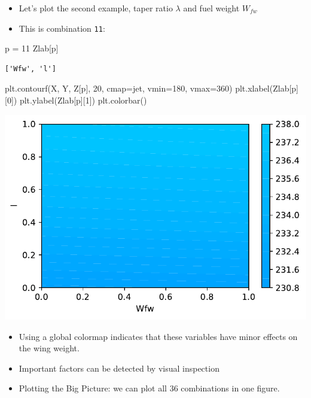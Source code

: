 \documentclass[
  letterpaper,
  DIV=11,
  numbers=noendperiod]{scrreprt}
\newenvironment{Shaded}{\begin{snugshade}}{\end{snugshade}}
\newcommand{\DecValTok}[1]{\textcolor[rgb]{0.68,0.00,0.00}{#1}}
\newcommand{\NormalTok}[1]{\textcolor[rgb]{0.00,0.23,0.31}{#1}}
\newcommand{\OperatorTok}[1]{\textcolor[rgb]{0.37,0.37,0.37}{#1}}
\newcommand{\StringTok}[1]{\textcolor[rgb]{0.13,0.47,0.30}{#1}}
\providecommand{\tightlist}{%
  \setlength{\itemsep}{0pt}\setlength{\parskip}{0pt}}\usepackage{longtable,booktabs,array}
\begin{document}
\begin{itemize}
\tightlist
\item
  Let's plot the second example, taper ratio \(\lambda\) and fuel weight
  \(W_{fw}\)
\item
  This is combination \texttt{11}:
\end{itemize}

\begin{Shaded}
\begin{Highlighting}[]
\NormalTok{p }\OperatorTok{=} \DecValTok{11}
\NormalTok{Zlab[p]}
\end{Highlighting}
\end{Shaded}

\begin{verbatim}
['Wfw', 'l']
\end{verbatim}

\begin{Shaded}
\begin{Highlighting}[]
\NormalTok{plt.contourf(X, Y, Z[p], }\DecValTok{20}\NormalTok{, cmap}\OperatorTok{=}\StringTok{\textquotesingle{}jet\textquotesingle{}}\NormalTok{, vmin}\OperatorTok{=}\DecValTok{180}\NormalTok{, vmax}\OperatorTok{=}\DecValTok{360}\NormalTok{)}
\NormalTok{plt.xlabel(Zlab[p][}\DecValTok{0}\NormalTok{])}
\NormalTok{plt.ylabel(Zlab[p][}\DecValTok{1}\NormalTok{])}
\NormalTok{plt.colorbar()}
\end{Highlighting}
\end{Shaded}

\includegraphics{002_awwe_files/figure-pdf/cell-13-output-1.pdf}

\begin{itemize}
\tightlist
\item
  Using a global colormap indicates that these variables have minor
  effects on the wing weight.
\item
  Important factors can be detected by visual inspection
\item
  Plotting the Big Picture: we can plot all 36 combinations in one
  figure.
\end{itemize}
\end{document}

